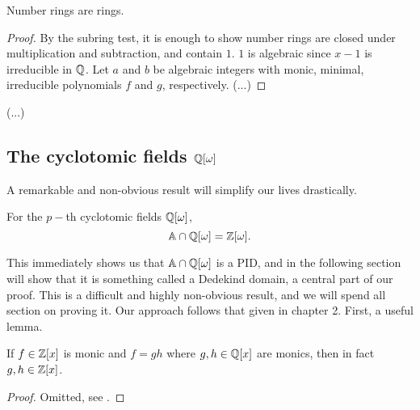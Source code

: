 \begin{proposition}
Number rings are rings.
\end{proposition}
\begin{proof}
By the subring test, it is enough to show number rings are closed under multiplication and subtraction, and contain $1$. $1$ is algebraic since $x-1$ is irreducible in $\mathbb{Q}$. Let $a$ and $b$ be algebraic integers with monic, minimal, irreducible polynomials $f$ and $g$, respectively. (...)
\end{proof}
(...)
\subsection{The cyclotomic fields $\mathbb{Q}[\omega]$}
A remarkable and non-obvious result will simplify our lives drastically.
\begin{theorem}\label{algebriac-integers-are-Z[w]}
For the $p-$th cyclotomic fields $\mathbb{Q}[\omega]$,
$$\mathbb{A}\cap\mathbb{Q}[\omega]= \mathbb{Z}[\omega].$$
\end{theorem}
This immediately shows us that $\mathbb{A}\cap \mathbb{Q}[\omega]$ is a PID, and in the following section will show that it is something called a Dedekind domain, a central part of our proof. This is a difficult and highly non-obvious result, and we will spend all section on proving it. Our approach follows that given in \cite{NumberFields} chapter 2. First, a useful lemma.

\begin{lemma}\label{lemma-monics-are-Z}
If $f\in \mathbb{Z}[x]$ is monic and $f=gh$ where $g,h\in \mathbb{Q}[x]$ are monics, then in fact $g,h\in \mathbb{Z}[x]$.
\end{lemma}
\begin{proof}
Omitted, see \cite{NumberFields}.
\end{proof}

